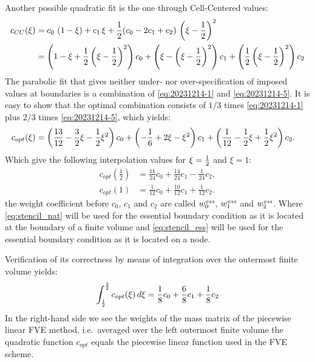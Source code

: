 Another possible quadratic fit is the one through Cell-Centered values:
\begin{align}
    c_{CC}(\xi) & = c_0 \, \left(1 - \xi\right) + c_1\,  \xi + \frac{1}{2} (c_0 - 2c_1 + c_2) \,   \left(\xi - \frac{1}{2}\right)^2
    \\
    & = \left( 1 - \xi + \frac{1}{2} \left(\xi - \frac{1}{2}\right)^2 \right) c_0 +
    \left( \xi - \left(\xi - \frac{1}{2}\right)^2  \right) c_1  +
    \left(   \frac{1}{2} \left(\xi - \frac{1}{2}\right)^2\right) c_2       \label{eq:20231214-5}
\end{align}
The parabolic fit that gives neither under- nor over-specification of
imposed values at boundaries is a combination of \autoref{eq:20231214-1} and \eqref{eq:20231214-5}.
It is easy to show that the optimal combination consists of $1/3$ times \autoref{eq:20231214-1} plus $2/3$ times \autoref{eq:20231214-5}, which yields:
\begin{align}
    c_{opt}(\xi) & = \left( \frac{13}{12} - \frac{3}{2}\xi - \frac{1}{2} \xi^2 \right) c_0 +
    \left( -\frac{1}{6} + 2 \xi - \xi^2 \right) c_1  +
    \left( \frac{1}{12} - \frac{1}{2} \xi +  \frac{1}{2} \xi^2  \right) c_2.
\end{align}
Which give the following interpolation values for $\xi=\frac{1}{2}$ and $\xi=1$:
\begin{align}
    c_{opt}\left(\textstyle\frac{1}{2}\right) & = \frac{11}{24} c_0 + \frac{14}{24} c_1 - \frac{1}{24} c_2 \label{eq:stencil_nat},
    \\
    c_{opt}\left(1\right)  & = \frac{1}{12} c_0 + \frac{10}{12} c_1 + \frac{1}{12}c_2 \label{eq:stencil_ess}.
\end{align}
the weight coefficient before $c_0$, $c_1$ and $c_2$ are called $w^{\it ess}_0$, $w^{\it ess}_1$ and $w^{\it ess}_2$.
Where \autoref{eq:stencil_nat} will be used for the essential boundary condition as it is located at the boundary of a finite volume and \autoref{eq:stencil_ess} will be used for the essential boundary condition as it is located on a node.

Verification of its correctness by means of integration over the outermost finite volume yields:
\begin{align}
\int_{{\frac{1}{2}}}^{{\frac{3}{2}}} c_{opt}(\xi)\, d\xi = \frac{1}{8} c_0 + \frac{6}{8} c_1 + \frac{1}{8} c_2
\end{align}
In the right-hand side we see the weights of the mass matrix of the piecewise linear FVE
method, i.e.\ averaged over the left outermost finite volume the quadratic function $c_{opt}$
equals the piecewise linear function used in the FVE scheme.
